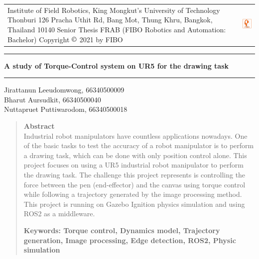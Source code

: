\documentclass[10pt]{article}
\begin{document}
\noindent
\begin{tabular}{p{} c} 
    \parbox[t]{0.90\textwidth}{ 
        \raggedright 
        Institute of Field Robotics, King Mongkut's University of Technology Thonburi \\
        126 Pracha Uthit Rd, Bang Mot, Thung Khru, Bangkok, Thailand 10140 \\
        Senior Thesis FRAB (FIBO Robotics and Automation: Bachelor) \\
        Copyright $\copyright$ 2021 by FIBO
        \vspace{0.5cm}
    }
    & 
    \raisebox{-1.4cm}
    {
        \includegraphics[width=0.7in, keepaspectratio]{img/fibo_logo.png}
    }
\end{tabular}

\noindent
\rule{\textwidth}{1pt}

\vspace{0.4cm}
\noindent
\Large {\textbf{A study of Torque-Control system on UR5 for the drawing task}}

\noindent
\rule{\textwidth}{0.3pt}

\begin{minipage}[t]{0.40\textwidth}
    \raggedright
    \normalsize
    Jirattanun Leeudomwong, 66340500009 \\
    Bharut Aursudkit, 66340500040 \\
    Nuttapruet Puttiwarodom, 66340500018 \\
\end{minipage}
\hfill
\vline
\begin{minipage}[t]{0.60\textwidth}
    \raggedright
    \normalsize
    \begin{quote}
        \textbf{Abstract} \\
        Industrial robot manipulators have countless applications nowadays. One of the basic tasks to test the accuracy of a robot manipulator is to perform a drawing task, which can be done with only position control alone. This project focuses on using a UR5 industrial robot manipulator to perform the drawing task. The challenge this project represents is controlling the force between the pen (end-effector) and the canvas using torque control while following a trajectory generated by the image processing method. This project is running on Gazebo Ignition physics simulation and using ROS2 as a middleware.
        \vspace{0.5cm}

        \textbf{Keywords: Torque control, Dynamics model, Trajectory generation, Image processing, Edge detection, ROS2, Physic simulation}
    \end{quote}
\end{minipage}
\end{document}
